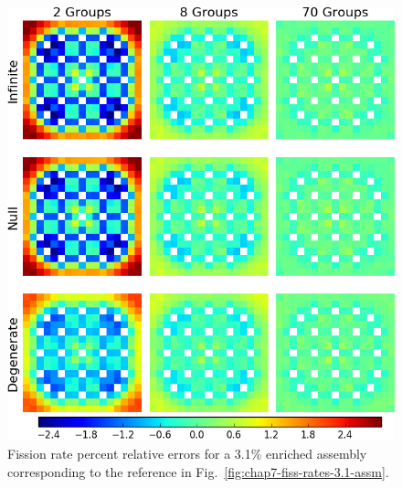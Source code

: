 \begin{appendices}
\begin{figure}[h!]
\centering
\includegraphics[width=\linewidth]{figures/quantification/appendix/assm-31/fiss-err}
\vspace{2mm}
\caption[Fission rate errors for a 3.1\% enriched assembly]{Fission rate percent relative errors for a 3.1\% enriched assembly corresponding to the reference in Fig.~\ref{fig:chap7-fiss-rates-3.1-assm}.}
\label{fig:quantify-assm-3.1-fiss-err}
\end{figure}

\clearpage


\end{appendices}
